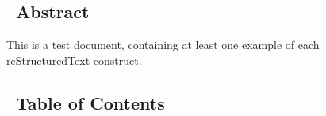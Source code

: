 \documentclass[10pt,english]{article}
\begin{document}
\subsection*{~\hfill Abstract\hfill ~}

This is a test document, containing at least one example of each
reStructuredText construct.

\hypertarget{table-of-contents}{}
\subsection*{~\hfill Table of Contents\hfill ~}
\end{document}

